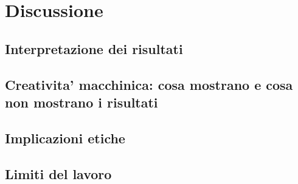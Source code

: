 \chapter{Discussione}
\label{cap:discussione}


\section{Interpretazione dei risultati}
\label{sec:interpretazione}

\section{Creativita' macchinica: cosa mostrano e cosa non mostrano i risultati}
\label{sec:creativita-macchinica}

\section{Implicazioni etiche}
\label{sec:implicazioni-etiche}

\section{Limiti del lavoro}
\label{sec:limiti}
